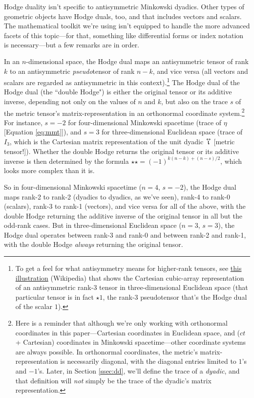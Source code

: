 \documentclass[12pt]{article}
\newcommand{\tightoverset}[2]{%
  \mathop{#2}\limits^{\vbox to -.5ex{\kern-0.75ex\hbox{$#1$}\vss}}}
\newcommand{\inlinedy}[1]{\tightoverset{\text{\tiny$\bm\leftrightarrow$}}{#1}}
\begin{document}
Hodge duality isn't specific to antisymmetric Minkowski dyadics. Other types of geometric objects have Hodge duals, too, and that includes vectors and scalars. The mathematical toolkit we're using isn't equipped to handle the more advanced facets of this topic---for that, something like differential forms or index notation is necessary---but a few remarks are in order.

In an $n$-dimensional space, the Hodge dual maps an antisymmetric tensor of rank $k$ to an antisymmetric \emph{pseudo}tensor of rank $n - k$, and vice versa (all vectors and scalars are regarded as antisymmetric in this context).\footnote{To get a feel for what antisymmetry means for higher-rank tensors, see \href{https://en.wikipedia.org/wiki/Levi-Civita_symbol\#/media/File:Epsilontensor.svg}{this illustration} (Wikipedia) that shows the Cartesian cubic-array representation of an antisymmetric rank-3 tensor in three-dimensional Euclidean space (that particular tensor is in fact $\star 1$, the rank-3 pseudotensor that's the Hodge dual of the scalar $1$).} The Hodge dual of the Hodge dual (the ``double Hodge") is either the original tensor or its additive inverse, depending not only on the values of $n$ and $k$, but also on the trace $s$ of the metric tensor's matrix-representation in an orthonormal coordinate system.\footnote{Here is a reminder that although we're only working with orthonormal coordinates in this paper---Cartesian coordinates in Euclidean space, and ($ct$ + Cartesian) coordinates in Minkowski spacetime---other coordinate systems are always possible. In orthonormal coordinates, the metric's matrix-representation is necessarily diagonal, with the diagonal entries limited to $1$'s and $-1$'s. Later, in Section \ref{ssec:dd}, we'll define the trace of a \emph{dyadic}, and that definition will \emph{not} simply be the trace of the dyadic's matrix representation.} For instance, $s = -2$ for four-dimensional Minkowski spacetime (trace of $\eta$ [Equation \ref{eq:mmt}]), and $s = 3$ for three-dimensional Euclidean space (trace of $I_3$, which is the Cartesian matrix representation of the unit dyadic $\inlinedy{\upiota}$ [metric tensor!]). Whether the double Hodge returns the original tensor or its additive inverse is then determined by the formula $\star \star = (-1)^{k(n-k) + (n-s)/2}$, which looks more complex than it is.

So in four-dimensional Minkowski spacetime ($n = 4$, $s = -2$), the Hodge dual maps rank-2 to rank-2 (dyadics to dyadics, as we've seen), rank-4 to rank-0 (scalars), rank-3 to rank-1 (vectors), and vice versa for all of the above, with the double Hodge returning the additive inverse of the original tensor in all but the odd-rank cases. But in three-dimensional Euclidean space ($n = 3$, $s = 3$), the Hodge dual operates between rank-3 and rank-0 and between rank-2 and rank-1, with the double Hodge \emph{always} returning the original tensor.
\end{document}
